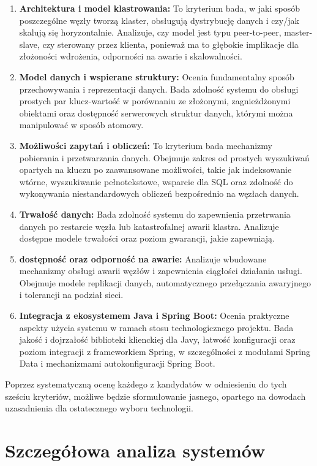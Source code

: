 \begin{enumerate}
    \item \textbf{Architektura i model klastrowania:} To kryterium bada, w jaki sposób poszczególne węzły tworzą klaster, obsługują dystrybucję danych i  czy/jak skalują się horyzontalnie. Analizuje, czy model jest typu peer-to-peer, master-slave, czy sterowany przez klienta, ponieważ ma to głębokie implikacje dla złożoności wdrożenia, odporności na awarie i skalowalności.
    \item \textbf{Model danych i wspierane struktury:} Ocenia fundamentalny sposób przechowywania i reprezentacji danych. Bada zdolność systemu do obsługi prostych par klucz-wartość w porównaniu ze złożonymi, zagnieżdżonymi obiektami oraz dostępność serwerowych struktur danych, którymi można manipulować w sposób atomowy.
    \item \textbf{Możliwości zapytań i obliczeń:} To kryterium bada mechanizmy pobierania i przetwarzania danych. Obejmuje zakres od prostych wyszukiwań opartych na kluczu po zaawansowane możliwości, takie jak indeksowanie wtórne, wyszukiwanie pełnotekstowe, wsparcie dla SQL oraz zdolność do wykonywania niestandardowych obliczeń bezpośrednio na węzłach danych.
    \item \textbf{Trwałość danych:} Bada zdolność systemu do zapewnienia przetrwania danych po restarcie węzła lub katastrofalnej awarii klastra. Analizuje dostępne modele trwałości oraz poziom gwarancji, jakie zapewniają.
    \item \textbf{dostępność oraz odporność na awarie:} Analizuje wbudowane mechanizmy obsługi awarii węzłów i zapewnienia ciągłości działania usługi. Obejmuje modele replikacji danych, automatycznego przełączania awaryjnego  i tolerancji na podział sieci.
    \item \textbf{Integracja z ekosystemem Java i Spring Boot:} Ocenia praktyczne aspekty użycia systemu w ramach stosu technologicznego projektu. Bada jakość i dojrzałość biblioteki klienckiej dla Javy, łatwość konfiguracji oraz poziom integracji z frameworkiem Spring, w szczególności z modułami Spring Data i mechanizmami autokonfiguracji Spring Boot.
\end{enumerate}

Poprzez systematyczną ocenę każdego z kandydatów w odniesieniu do tych sześciu kryteriów, możliwe będzie sformułowanie jasnego, opartego na dowodach uzasadnienia dla ostatecznego wyboru technologii.

\section{Szczegółowa analiza systemów}

